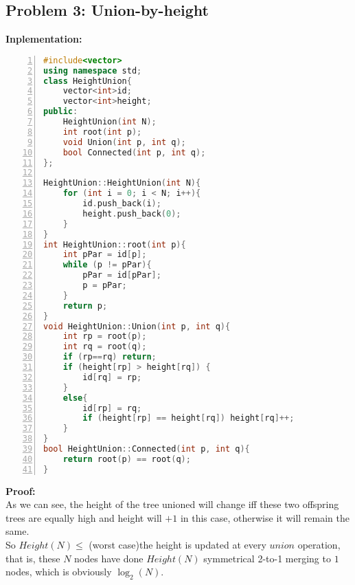 \documentclass[a4paper]{article}
\begin{document}
\begin{spacing}{1.3}
\section*{Problem 3: Union-by-height}
\textbf{Inplementation:}
\begin{lstlisting}[language={C++},basicstyle=\footnotesize,numbers=left,numberstyle=\tiny,keywordstyle=\color{blue!70},commentstyle=\color{red!50!green!50!blue!50},frame=shadowbox, rulesepcolor=\color{red!20!green!20!blue!20}] 
#include<vector>
using namespace std;
class HeightUnion{
	vector<int>id;
	vector<int>height;
public:
	HeightUnion(int N);
	int root(int p);
	void Union(int p, int q);
	bool Connected(int p, int q);
};

HeightUnion::HeightUnion(int N){
	for (int i = 0; i < N; i++){
		id.push_back(i);
		height.push_back(0);
	}
}
int HeightUnion::root(int p){
	int pPar = id[p];
	while (p != pPar){
		pPar = id[pPar];
		p = pPar;
	}
	return p;
}
void HeightUnion::Union(int p, int q){
	int rp = root(p);
	int rq = root(q);
	if (rp==rq) return;
	if (height[rp] > height[rq]) {
		id[rq] = rp;
	}
	else{
		id[rp] = rq;
		if (height[rp] == height[rq]) height[rq]++;
	}
}
bool HeightUnion::Connected(int p, int q){
	return root(p) == root(q);
}
\end{lstlisting}
\textbf{Proof:}
\\As we can see, the height of the tree unioned will change iff these two offspring trees are equally high and height will $+1$ in this case, otherwise it will remain the same.
\\So $Height(N) \leq$ (worst case)the height is updated at every $union$ operation, that is, these $N$ nodes have done $Height(N)$ symmetrical 2-to-1 merging to $1$ nodes, which is obviously $\log_2(N)$.
\end{spacing}
\end{document}
